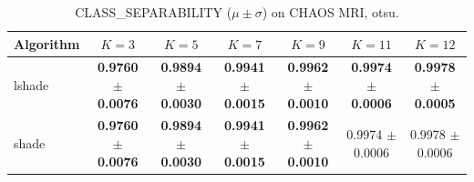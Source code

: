 \begin{table}[htbp]
\centering
\caption{CLASS_SEPARABILITY ($\mu \pm \sigma$) on CHAOS MRI, otsu.}
\label{tab:exp2-otsu-class_separability}
\begin{tabular}{lcccccc}
\toprule
Algorithm & $K=3$ & $K=5$ & $K=7$ & $K=9$ & $K=11$ & $K=12$ \\
\midrule
lshade & \textbf{0.9760 $\pm$ 0.0076} & \textbf{0.9894 $\pm$ 0.0030} & \textbf{0.9941 $\pm$ 0.0015} & \textbf{0.9962 $\pm$ 0.0010} & \textbf{0.9974 $\pm$ 0.0006} & \textbf{0.9978 $\pm$ 0.0005} \\
shade & \textbf{0.9760 $\pm$ 0.0076} & \textbf{0.9894 $\pm$ 0.0030} & \textbf{0.9941 $\pm$ 0.0015} & \textbf{0.9962 $\pm$ 0.0010} & 0.9974 $\pm$ 0.0006 & 0.9978 $\pm$ 0.0006 \\
\bottomrule
\end{tabular}
\end{table}